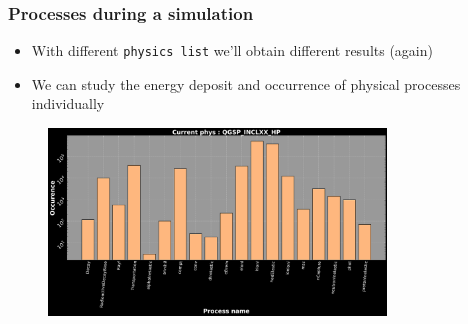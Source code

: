 \begin{frame}
\frametitle{Processes during a simulation}

\begin{block}{}
	\begin{itemize}
		\item With different \texttt{physics list} we'll obtain different results (again)
		\item We can study the energy deposit and occurrence of physical processes individually
	\end{itemize}
\end{block}

\begin{figure}
	\includegraphics[width=0.8\textwidth]{images/process_dist_E100_phQGSP_INCLXX_HP.png}
\end{figure}

\end{frame}